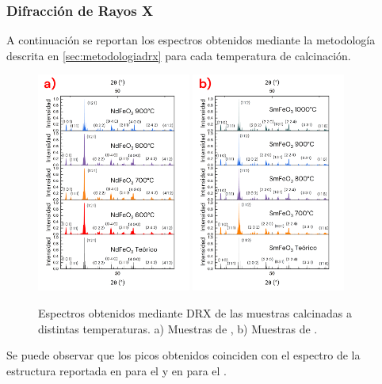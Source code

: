 \documentclass[../main.tex]{subfiles}
\begin{document}
\subsubsection{Difracción de Rayos X} \label{sec:analisisDRX}
A continuación se reportan los espectros obtenidos mediante la metodología descrita en \ref{sec:metodologiadrx} para cada temperatura de calcinación.
\begin{figure}[H]
    \centering
    \includegraphics[width=0.45\textwidth]{fig/drxtempndfeo3.png}
    \quad
    \includegraphics[width=0.45\textwidth]{fig/drxtempsmfeo3.png}
    \caption{Espectros obtenidos mediante DRX de las muestras calcinadas a distintas temperaturas. a) Muestras de \neod{}, b) Muestras de \sama{}.}
    \label{fig:drxtempcomp}
\end{figure}
Se puede observar que los picos obtenidos coinciden con el espectro de la estructura reportada en \cite{ndfeo3} para el \neod{} y en \cite{smfeo3} para el \sama{}.
\end{document}

